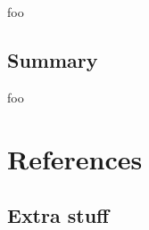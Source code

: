 \documentclass[letter,12pt]{article}
\begin{document}
foo

\subsection{Summary}

foo

\vfill
\clearpage %

\section{References}
\printbibliography[heading=none]

\vfill
\clearpage %

\begin{appendices}

\section{Extra stuff}
\label{appendix:rthpss}

\end{appendices}
\end{document}
